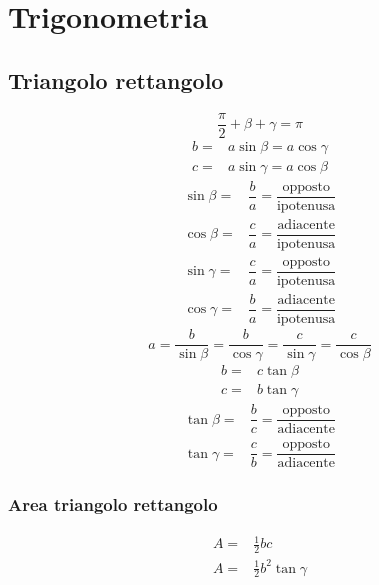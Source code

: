 \chapter{Trigonometria}
\section{Triangolo rettangolo}
\begin{center}
	
\end{center}
\begin{equation*}
\dfrac{\pi}{2}+\beta+\gamma=\pi
\end{equation*}
\begin{align*}
b=&a\sin\beta=a\cos\gamma\\
c=&a\sin\gamma=a\cos\beta
\end{align*}
\begin{align*}
\sin\beta=&\dfrac{b}{a}=\dfrac{\text{opposto}}{\text{ipotenusa}}\\
\cos\beta=&\dfrac{c}{a}=\dfrac{\text{adiacente}}{\text{ipotenusa}}\\
\sin\gamma=&\dfrac{c}{a}=\dfrac{\text{opposto}}{\text{ipotenusa}}\\
\cos\gamma=&\dfrac{b}{a}=\dfrac{\text{adiacente}}{\text{ipotenusa}}
\end{align*}
\begin{equation*}
a=\dfrac{b}{\sin\beta}=\dfrac{b}{\cos\gamma}=\dfrac{c}{\sin\gamma}=\dfrac{c}{\cos\beta}
\end{equation*}
\begin{align*}
b=&c\tan\beta\\
c=&b\tan\gamma
\end{align*}
\begin{align*}
\tan\beta=&\dfrac{b}{c}=\dfrac{\text{opposto}}{\text{adiacente}}\\
\tan\gamma=&\dfrac{c}{b}=\dfrac{\text{opposto}}{\text{adiacente}}
\end{align*}
\subsection{Area triangolo rettangolo}
\begin{align*}
A=&\frac{1}{2}bc\\
A=&\frac{1}{2}b^2\tan\gamma\\
\end{align*}
